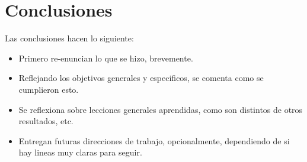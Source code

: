 \chapter{Conclusiones}
\label{c6} %

Las conclusiones hacen lo siguiente:

\begin{itemize}
    \item Primero re-enuncian lo que se hizo, brevemente.
    \item Reflejando los objetivos generales y especificos, se comenta como se cumplieron esto.
    \item Se reflexiona sobre lecciones generales aprendidas, como son distintos de otros resultados, etc.
    \item Entregan futuras direcciones de trabajo, opcionalmente, dependiendo de si hay lineas muy claras para seguir. 
\end{itemize}